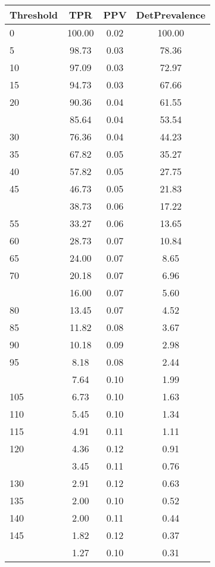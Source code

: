 \begin{table}[ht]
\centering
\begin{tabular}{lccc}
  \toprule
Threshold & TPR & PPV & DetPrevalence \\ 
  \midrule
0 & 100.00 & 0.02 & 100.00 \\ 
  5 & 98.73 & 0.03 & 78.36 \\ 
  10 & 97.09 & 0.03 & 72.97 \\ 
  15 & 94.73 & 0.03 & 67.66 \\ 
  20 & 90.36 & 0.04 & 61.55 \\ 
   \addlinespace
25 & 85.64 & 0.04 & 53.54 \\ 
  30 & 76.36 & 0.04 & 44.23 \\ 
  35 & 67.82 & 0.05 & 35.27 \\ 
  40 & 57.82 & 0.05 & 27.75 \\ 
  45 & 46.73 & 0.05 & 21.83 \\ 
   \addlinespace
50 & 38.73 & 0.06 & 17.22 \\ 
  55 & 33.27 & 0.06 & 13.65 \\ 
  60 & 28.73 & 0.07 & 10.84 \\ 
  65 & 24.00 & 0.07 & 8.65 \\ 
  70 & 20.18 & 0.07 & 6.96 \\ 
   \addlinespace
75 & 16.00 & 0.07 & 5.60 \\ 
  80 & 13.45 & 0.07 & 4.52 \\ 
  85 & 11.82 & 0.08 & 3.67 \\ 
  90 & 10.18 & 0.09 & 2.98 \\ 
  95 & 8.18 & 0.08 & 2.44 \\ 
   \addlinespace
100 & 7.64 & 0.10 & 1.99 \\ 
  105 & 6.73 & 0.10 & 1.63 \\ 
  110 & 5.45 & 0.10 & 1.34 \\ 
  115 & 4.91 & 0.11 & 1.11 \\ 
  120 & 4.36 & 0.12 & 0.91 \\ 
   \addlinespace
125 & 3.45 & 0.11 & 0.76 \\ 
  130 & 2.91 & 0.12 & 0.63 \\ 
  135 & 2.00 & 0.10 & 0.52 \\ 
  140 & 2.00 & 0.11 & 0.44 \\ 
  145 & 1.82 & 0.12 & 0.37 \\ 
   \addlinespace
150 & 1.27 & 0.10 & 0.31 \\ 

\end{tabular}
\end{table}
